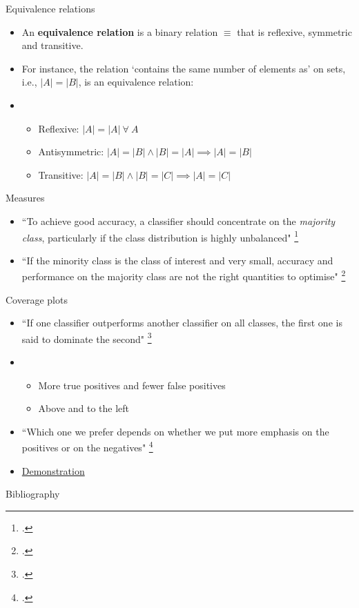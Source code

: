 \documentclass[10pt]{beamer}
\begin{document}
\begin{frame}
	{Equivalence relations}
	\begin{itemize}
		\item An \textbf{equivalence relation} is a binary relation $\equiv$ that is reflexive, symmetric and transitive.
		\item For instance, the relation `contains the same number of elements as' on sets, i.e., $\lvert A \rvert = \lvert B \rvert$, is an equivalence relation:
		\item[] \begin{itemize}
			      \item[\checkmark]
			            Reflexive:
			            $\lvert A \rvert = \lvert A \rvert\ \forall\ A$
			      \item[\checkmark]
			            Antisymmetric:
			            $\lvert A \rvert = \lvert B \rvert \land \lvert B \rvert = \lvert A \rvert \implies \lvert A \rvert = \lvert B \rvert$
			      \item[\checkmark]
			            Transitive:
			            $\lvert A \rvert = \lvert B \rvert \land \lvert B \rvert = \lvert C \rvert \implies \lvert A \rvert = \lvert C \rvert$
		      \end{itemize}
	\end{itemize}
\end{frame}

\begin{frame}
	{Measures}
	\begin{itemize}
		\item ``To achieve good accuracy, a classifier should concentrate on the \textit{majority class}, particularly if the class distribution is highly unbalanced"
		      \footcite[p.56]{Flach2012}
		\item ``If the minority class is the class of interest and very small, accuracy and performance on the majority class are not the right quantities to optimise"
		      \footcite[p.57]{Flach2012}
	\end{itemize}
\end{frame}

\begin{frame}
	{Coverage plots}
	\begin{itemize}
		\item ``If one classifier outperforms another classifier on all classes, the first one is said to dominate the second"
		      \footcite[p.59]{Flach2012}
		\item[] \begin{itemize}
			      \item More true positives and fewer false positives
			      \item Above and to the left
		      \end{itemize}
		\item ``Which one we prefer depends on whether we put more emphasis on the positives or on the negatives"
		      \footcite[p.59]{Flach2012}
		\item \href{https://coverage-plots.vercel.app/}{Demonstration}
	\end{itemize}
\end{frame}

\begin{frame}
	{Bibliography}
	\renewcommand*{\bibfont}{\footnotesize}
	\printbibliography
\end{frame}
\end{document}
